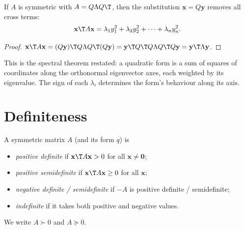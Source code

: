 \begin{theorem}\label{thm:principalaxes}
If $A$ is symmetric with $A=Q\Lambda Q\T$, then the substitution $\mathbf{x}=Q\mathbf{y}$ removes all cross terms:
\[ \mathbf{x}\T A\mathbf{x}=\lambda_1y_1^2+\lambda_2y_2^2+\dots+\lambda_ny_n^2. \]
\end{theorem}

\begin{proof}
$\mathbf{x}\T A\mathbf{x}=(Q\mathbf{y})\T Q\Lambda Q\T(Q\mathbf{y})=\mathbf{y}\T Q\T Q\Lambda Q\T Q\mathbf{y}=\mathbf{y}\T\Lambda\mathbf{y}$.
\end{proof}

This is the spectral theorem restated: a quadratic form is a sum of squares of coordinates along the orthonormal eigenvector axes, each weighted by its eigenvalue. The sign of each $\lambda_i$ determines the form's behaviour along its axis.

\section{Definiteness}

\begin{definition}[Definiteness]
A symmetric matrix $A$ (and its form $q$) is
\begin{itemize}
  \item \emph{positive definite} if $\mathbf{x}\T A\mathbf{x}>0$ for all $\mathbf{x}\ne\mathbf{0}$;
  \item \emph{positive semidefinite} if $\mathbf{x}\T A\mathbf{x}\ge0$ for all $\mathbf{x}$;
  \item \emph{negative definite / semidefinite} if $-A$ is positive definite / semidefinite;
  \item \emph{indefinite} if it takes both positive and negative values.
\end{itemize}
We write $A\succ0$ and $A\succeq0$.
\end{definition}

